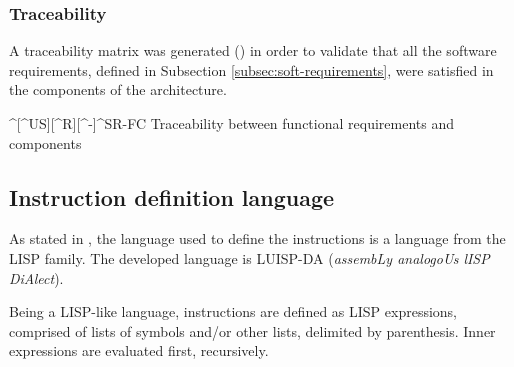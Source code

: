 \FloatBarrier


\subsubsection{Traceability}\label{subsec:comp-traceability}
A traceability matrix was generated () in order to validate that all the software requirements, defined in Subsection \ref{subsec:soft-requirements}, were satisfied in the components of the architecture.

  {^[^US][^R][^-]}{^SR-FC}
  {Traceability between functional requirements and components}

\FloatBarrier


\subsection{Instruction definition language}
As stated in , the language used to define the instructions is a language from the LISP family. The developed language is LUISP-DA (\textit{assembLy analogoUs lISP DiAlect}).

Being a LISP-like language, instructions are defined as LISP expressions, comprised of lists of symbols and/or other lists, delimited by parenthesis. Inner expressions are evaluated first, recursively.

